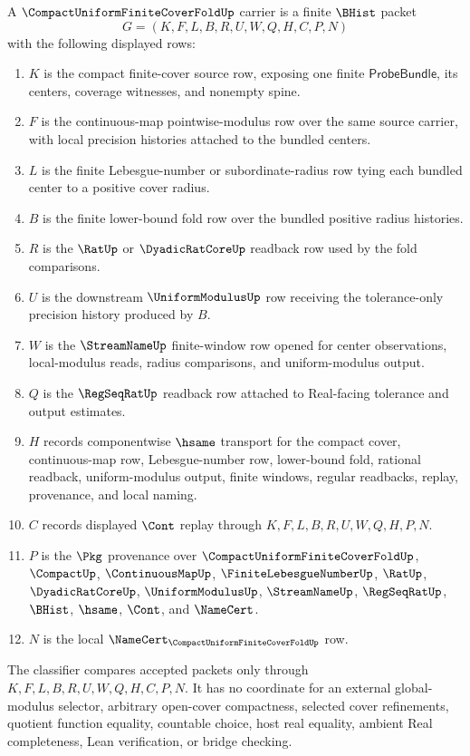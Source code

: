 \begin{definition}
\label{def:compact-uniform-finite-cover-fold-carrier}
A $\CompactUniformFiniteCoverFoldUp$ carrier is a finite $\BHist$ packet
$$
G=(K,F,L,B,R,U,W,Q,H,C,P,N)
$$
with the following displayed rows:
\begin{enumerate}
\item $K$ is the compact finite-cover source row, exposing one finite $\mathsf{ProbeBundle}$, its centers, coverage witnesses, and nonempty spine.
\item $F$ is the continuous-map pointwise-modulus row over the same source carrier, with local precision histories attached to the bundled centers.
\item $L$ is the finite Lebesgue-number or subordinate-radius row tying each bundled center to a positive cover radius.
\item $B$ is the finite lower-bound fold row over the bundled positive radius histories.
\item $R$ is the $\RatUp$ or $\DyadicRatCoreUp$ readback row used by the fold comparisons.
\item $U$ is the downstream $\UniformModulusUp$ row receiving the tolerance-only precision history produced by $B$.
\item $W$ is the $\StreamNameUp$ finite-window row opened for center observations, local-modulus reads, radius comparisons, and uniform-modulus output.
\item $Q$ is the $\RegSeqRatUp$ readback row attached to Real-facing tolerance and output estimates.
\item $H$ records componentwise $\hsame$ transport for the compact cover, continuous-map row, Lebesgue-number row, lower-bound fold, rational readback, uniform-modulus output, finite windows, regular readbacks, replay, provenance, and local naming.
\item $C$ records displayed $\Cont$ replay through $K,F,L,B,R,U,W,Q,H,P,N$.
\item $P$ is the $\Pkg$ provenance over $\CompactUniformFiniteCoverFoldUp$, $\CompactUp$, $\ContinuousMapUp$, $\FiniteLebesgueNumberUp$, $\RatUp$, $\DyadicRatCoreUp$, $\UniformModulusUp$, $\StreamNameUp$, $\RegSeqRatUp$, $\BHist$, $\hsame$, $\Cont$, and $\NameCert$.
\item $N$ is the local $\NameCert_{\CompactUniformFiniteCoverFoldUp}$ row.
\end{enumerate}
The classifier compares accepted packets only through $K,F,L,B,R,U,W,Q,H,C,P,N$. It has no coordinate for an external global-modulus selector, arbitrary open-cover compactness, selected cover refinements, quotient function equality, countable choice, host real equality, ambient Real completeness, Lean verification, or bridge checking.
\end{definition}

